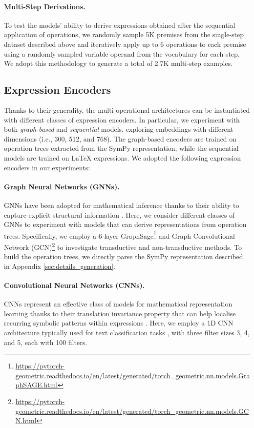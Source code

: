 \documentclass[11pt]{article}
\begin{document}
\paragraph{Multi-Step Derivations.} To test the models' ability to derive expressions obtained after the sequential application of operations, we randomly sample 5K premises from the single-step dataset described above and iteratively apply up to 6 operations to each premise using a randomly sampled variable operand from the vocabulary for each step.
We adopt this methodology to generate a total of 2.7K multi-step examples.


\subsection{Expression Encoders}
Thanks to their generality, the multi-operational architectures can be instantiated with different classes of expression encoders. In particular, we experiment with both \emph{graph-based} and \emph{sequential} models, exploring embeddings with different dimensions (i.e., 300, 512, and 768). The graph-based encoders are trained on operation trees extracted from the SymPy representation, while the sequential models are trained on LaTeX expressions. We adopted the following expression encoders in our experiments:

\paragraph{Graph Neural Networks (GNNs).}  GNNs have been adopted for mathematical inference thanks to their ability to capture explicit structural information \cite{lee2019mathematical}. Here, we consider different classes of GNNs to experiment with models that can derive representations from operation trees. Specifically, we employ a 6-layer GraphSage\footnote{\url{https://pytorch-geometric.readthedocs.io/en/latest/generated/torch_geometric.nn.models.GraphSAGE.html}}\cite{hamilton2017inductive} and Graph Convolutional Network (GCN)\footnote{\url{https://pytorch-geometric.readthedocs.io/en/latest/generated/torch_geometric.nn.models.GCN.html}} \cite{kipf2016semi} to investigate transductive and non-transductive methods. To build the operation trees, we directly parse the SymPy representation described in Appendix \ref{sec:details_generation}.

\paragraph{Convolutional Neural Networks (CNNs).} CNNs represent an effective class of models for mathematical representation learning thanks to their translation invariance property that can help localise recurring symbolic patterns within expressions \cite{petersen-etal-2023-neural}. Here, we employ a 1D CNN architecture typically used for text classification tasks \cite{kim2014convolutional}, with three filter sizes 3, 4, and 5, each with 100 filters.
\end{document}

